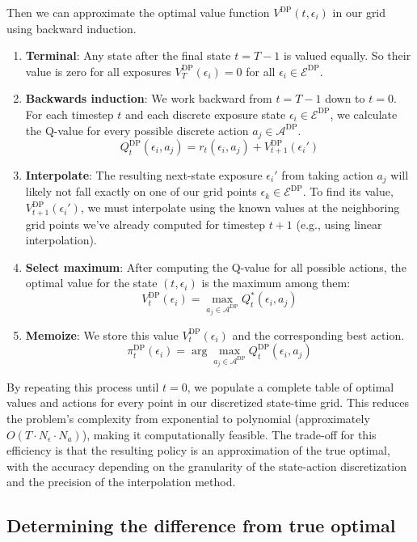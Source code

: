 Then we can approximate the optimal value function $V^\text{DP}(t,\epsilon_i)$ in our grid using backward induction.
\begin{enumerate}
    \item \textbf{Terminal}: Any state after the final state $t=T-1$ is valued equally. So their value is zero for all exposures $V^\text{DP}_T(\epsilon_i) = 0$ for all $\epsilon_i \in \mathcal{E}^\text{DP}$.
    \item \textbf{Backwards induction}: We work backward from $t=T-1$ down to $t=0$. For each timestep $t$ and each discrete exposure state $\epsilon_i \in \mathcal{E}^\text{DP}$, we calculate the Q-value for every possible discrete action $a_j \in \mathcal{A}^\text{DP}$.
    $$
    Q_t^\text{DP}(\epsilon_i, a_j) = r_t(\epsilon_i, a_j) + V^\text{DP}_{t+1}(\epsilon_i')
    $$
    \item \textbf{Interpolate}: The resulting next-state exposure $\epsilon_i'$ from taking action $a_j$ will likely not fall exactly on one of our grid points $\epsilon_k \in \mathcal{E}^\text{DP}$. To find its value, $V^\text{DP}_{t+1}(\epsilon_i')$, we must interpolate using the known values at the neighboring grid points we've already computed for timestep $t+1$ (e.g., using linear interpolation).
    \item \textbf{Select maximum}: After computing the Q-value for all possible actions, the optimal value for the state $(t, \epsilon_i)$ is the maximum among them:
    $$
    V^\text{DP}_t(\epsilon_i) = \max_{a_j \in \mathcal{A}^\text{DP}} Q_t^*(\epsilon_i, a_j)
    $$
    \item \textbf{Memoize}: We store this value $V^\text{DP}_t(\epsilon_i)$ and the corresponding best action. 
    $$
    \pi^\text{DP}_t(\epsilon_i) = \arg\max_{a_j\in\mathcal{A}^\text{DP}} Q_t^\text{DP}(\epsilon_i, a_j)
    $$
\end{enumerate}

By repeating this process until $t=0$, we populate a complete table of optimal values and actions for every point in our discretized state-time grid. This reduces the problem's complexity from exponential to polynomial (approximately $O(T \cdot N_\epsilon \cdot N_a)$), making it computationally feasible. The trade-off for this efficiency is that the resulting policy is an approximation of the true optimal, with the accuracy depending on the granularity of the state-action discretization and the precision of the interpolation method.

\subsection{Determining the difference from true optimal}

